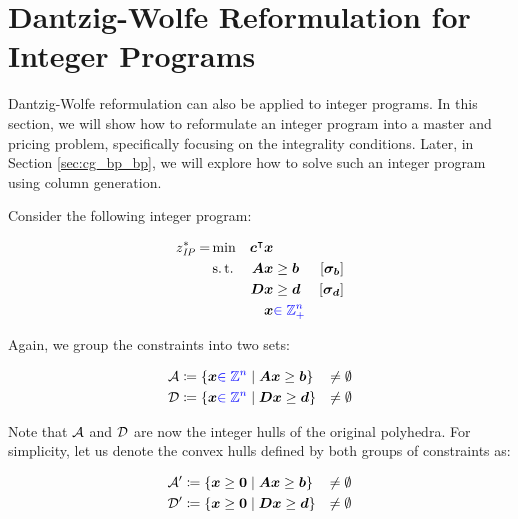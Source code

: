 \section{Dantzig-Wolfe Reformulation for Integer Programs}\label{sec:cg_bp_ip}
Dantzig-Wolfe reformulation can also be applied to integer programs. In this section, we will show how to reformulate an integer program into a master and pricing problem, specifically focusing on the integrality conditions. Later, in Section \ref{sec:cg_bp_bp}, we will explore how to solve such an integer program using column generation.

Consider the following integer program:

\begin{equation}
\begin{aligned}
z^*_{\textit{IP}}{} = &\min & {\bm{c}}^\intercal {\bm{x}} & & & \\
&\operatorname{s.t.} & {\bm{A}} {\bm{x}} & \geq {\bm{b}} & \left[{\bm{\sigma}}_{\bm{b}}\right] & \\
&& {\bm{D}} {\bm{x}} & \geq {\bm{d}} & \left[{\bm{\sigma}}_{\bm{d}}\right] & \\
&& {\bm{x}} & {\color{blue} \in \mathbb{Z}_ +^n}
\end{aligned}
\end{equation}

Again, we group the constraints into two sets:

\begin{equation}
\begin{aligned}
\mathcal{A} &\coloneqq \left\{ {\bm{x}} {\color{blue} \in \mathbb{Z}^n} \mid {\bm{A}} {\bm{x}} \geq {\bm{b}} \right\} &\neq \emptyset \\
\mathcal{D} &\coloneqq \left\{ {\bm{x}} {\color{blue} \in \mathbb{Z}^n} \mid {\bm{D}} {\bm{x}} \geq {\bm{d}} \right\} &\neq \emptyset
\end{aligned}
\end{equation}

Note that $\mathcal{A}$ and $\mathcal{D}$ are now the integer hulls of the original polyhedra. For simplicity, let us denote the convex hulls defined by both groups of constraints as:

\begin{equation}
\begin{aligned}
\mathcal{A}' &\coloneqq \left\{ {\bm{x}} \geq {\bm{0}} \mid {\bm{A}} {\bm{x}} \geq {\bm{b}} \right\} &\neq \emptyset \\
\mathcal{D}' &\coloneqq \left\{ {\bm{x}} \geq {\bm{0}} \mid {\bm{D}} {\bm{x}} \geq {\bm{d}} \right\} &\neq \emptyset
\end{aligned}
\end{equation}

